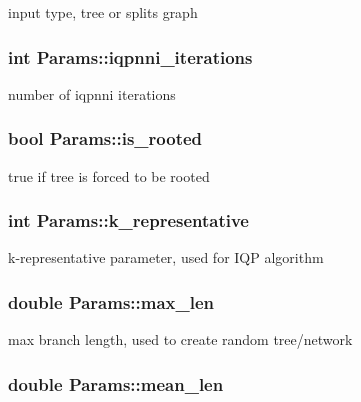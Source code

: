 \label{structParams_a3a37fea06df61c82fc8079ed54256d21}
input type, tree or splits graph \hypertarget{structParams_abe6f69e000e06dcc8aec92f8301b1f63}{
\subsubsection[{iqpnni\_\-iterations}]{\setlength{\rightskip}{0pt plus 5cm}int {\bf Params::iqpnni\_\-iterations}}}
\label{structParams_abe6f69e000e06dcc8aec92f8301b1f63}
number of iqpnni iterations \hypertarget{structParams_a31427c957607da1fda1078a5dfcc198e}{
\subsubsection[{is\_\-rooted}]{\setlength{\rightskip}{0pt plus 5cm}bool {\bf Params::is\_\-rooted}}}
\label{structParams_a31427c957607da1fda1078a5dfcc198e}
true if tree is forced to be rooted \hypertarget{structParams_ae0f41285759c8d6b4f059a1c3bd9b8ca}{
\subsubsection[{k\_\-representative}]{\setlength{\rightskip}{0pt plus 5cm}int {\bf Params::k\_\-representative}}}
\label{structParams_ae0f41285759c8d6b4f059a1c3bd9b8ca}
k-\/representative parameter, used for IQP algorithm \hypertarget{structParams_a48436529adb1e9fae4e7fc3ff0a7b7e9}{
\subsubsection[{max\_\-len}]{\setlength{\rightskip}{0pt plus 5cm}double {\bf Params::max\_\-len}}}
\label{structParams_a48436529adb1e9fae4e7fc3ff0a7b7e9}
max branch length, used to create random tree/network \hypertarget{structParams_ae0161060ce510ef5c0d4c190f04d612a}{
\subsubsection[{mean\_\-len}]{\setlength{\rightskip}{0pt plus 5cm}double {\bf Params::mean\_\-len}}}
